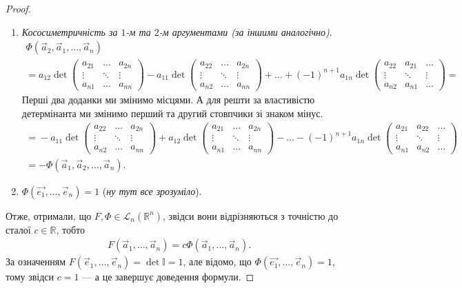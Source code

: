 \documentclass{math_library}
\begin{document}
\begin{proof}
\begin{enumerate}[wide=0pt,label={\Roman*.}]
\item \textit{Кососиметричність за $1$-м та $2$-м аргументами (за іншими аналогічно)}.
\begin{multline*}
\Phi(\vec{a}_2,\vec{a}_1,\dots,\vec{a}_n) \\
= a_{12} \det \begin{pmatrix} a_{21} & \dots & a_{2n} \\ \vdots & \ddots & \vdots \\ a_{n1} & \dots & a_{nn} \end{pmatrix} - a_{11} \det \begin{pmatrix} a_{22} & \dots & a_{2n} \\ \vdots & \ddots & \vdots \\ a_{n2} & \dots & a_{nn} \end{pmatrix} + \dots + (-1)^{n+1} a_{1n} \det \begin{pmatrix} a_{22} & a_{21} & \dots \\ \vdots & \ddots & \vdots \\ a_{n2} & a_{n1} & \dots \end{pmatrix} \boxed{=}
\end{multline*}
Перші два доданки ми змінимо місцями. А для решти за властивістю детермінанта ми змінимо перший та другий стовпчики зі знаком мінус.
\begin{multline*}
\boxed{=} - a_{11} \det \begin{pmatrix} a_{22} & \dots & a_{2n} \\ \vdots & \ddots & \vdots \\ a_{n2} & \dots & a_{nn} \end{pmatrix} + a_{12} \det \begin{pmatrix} a_{21} & \dots & a_{2n} \\ \vdots & \ddots & \vdots \\ a_{n1} & \dots & a_{nn} \end{pmatrix} - \dots - (-1)^{n+1} a_{1n} \det \begin{pmatrix} a_{21} & a_{22} & \dots \\ \vdots & \ddots & \vdots \\ a_{n1} & a_{n2} & \dots \end{pmatrix} \\ = -\Phi(\vec{a}_1,\vec{a}_2,\dots,\vec{a}_n).
\end{multline*}

\item $\Phi(\vec{e_1},\dots,\vec{e}_n) = 1$ (\textit{ну тут все зрозуміло}).
\end{enumerate}
Отже, отримали, що $F, \Phi \in \mathcal{L}_n(\mathbb{R}^n)$, звідси вони відрізняються з точністю до сталої $c \in \mathbb{R}$, тобто
\begin{align*}
F(\vec{a}_1,\dots,\vec{a}_n) = c \Phi(\vec{a}_1,\dots,\vec{a}_n).
\end{align*}
За означенням $F(\vec{e}_1,\dots,\vec{e}_n) = \det \mathbb{I} = 1$, але відомо, що $\Phi(\vec{e_1},\dots,\vec{e}_n) = 1$, тому звідси $c = 1$ --- а це завершує доведення формули.
\end{proof}
\end{document}
